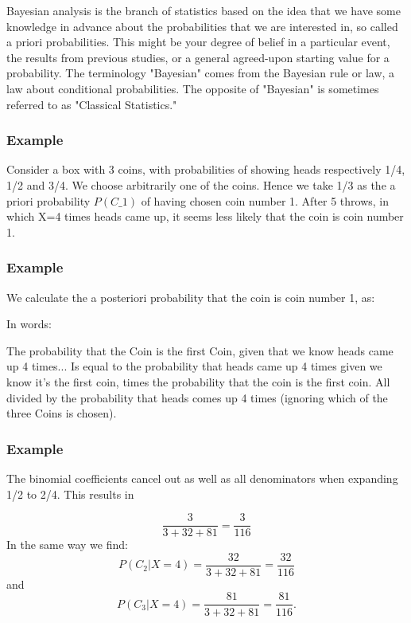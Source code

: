 \documentclass[slidemain.tex]{subfiles}
\begin{document}
 
	
\begin{frame}
	Bayesian analysis is the branch of statistics based on the idea that we have some knowledge in advance about the probabilities that we are interested in, so called a priori probabilities. This might be your degree of belief in a particular event, the results from previous studies, or a general agreed-upon starting value for a probability. The terminology "Bayesian" comes from the Bayesian rule or law, a law about conditional probabilities. The opposite of "Bayesian" is sometimes referred to as "Classical Statistics."
\end{frame}
\begin{frame}
\frametitle{Example}
Consider a box with 3 coins, with probabilities of showing heads respectively 1/4, 1/2 and 3/4. We choose arbitrarily one of the coins. Hence we take 1/3 as the a priori probability $P(C\_1)$ of having chosen coin number 1. After 5 throws, in which X=4 times heads came up, it seems less likely that the coin is coin number 1. 
\end{frame}
\begin{frame}
	\frametitle{Example}
We calculate the a posteriori probability that the coin is coin number 1, as:

In words:
\end{frame}
\begin{frame}
The probability that the Coin is the first Coin, given that we know heads came up 4 times... Is equal to the probability that heads came up 4 times given we know it's the first coin, times the probability that the coin is the first coin. All divided by the probability that heads comes up 4 times (ignoring which of the three Coins is chosen). 
\end{frame}
\begin{frame}
	\frametitle{Example}The binomial coefficients cancel out as well as all denominators when expanding 1/2 to 2/4. This results in

\[\frac{3}{3 + 32 + 81}=\frac{3}{116}\]
In the same way we find:
\[
P(C_2|X=4)=\frac{32}{3 + 32 + 81}=\frac{32}{116}\]
and
\[
P(C_3|X=4)=\frac{81}{3 + 32 + 81}=\frac{81}{116}.\]
\end{frame}
\end{document}
